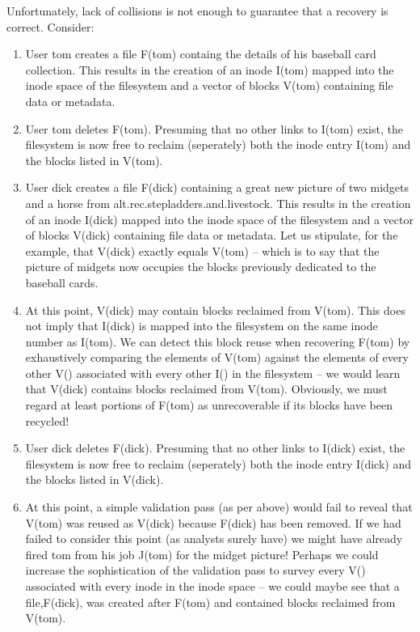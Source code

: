 \documentclass[letterpaper]{article}
\begin{document}
Unfortunately, lack of collisions is not enough to guarantee that a
recovery is correct. Consider:

\begin{enumerate}
\item User {\ttfamily tom} creates a file F(tom) containg the
details of his baseball card collection. This results in the
creation of an inode I(tom) mapped into the inode
space of the filesystem and a vector of blocks V(tom)
containing file data or metadata.
\item User {\ttfamily tom} deletes F(tom). Presuming that 
no other links to I(tom) exist, the filesystem is now
free to reclaim (seperately) both the inode entry I(tom)
and the blocks listed in V(tom).
\item User {\ttfamily dick} creates a file F(dick) containing
a great new picture of two midgets and a horse from
alt.rec.stepladders.and.livestock. This results in the creation
of an inode I(dick) mapped into the inode space of the
filesystem and a vector of blocks V(dick) containing file
data or metadata. Let us stipulate, for the example,
that V(dick) exactly equals V(tom) -- which is to say
that the picture of midgets now occupies the blocks
previously dedicated to the baseball cards.
\item At this point, V(dick) may contain blocks reclaimed from
V(tom). This does not imply that I(dick) is mapped into the
filesystem on the same inode number as I(tom). We can detect
this block reuse when recovering F(tom) by exhaustively
comparing the elements of V(tom) against the elements of
every other V() associated with every other I()
in the filesystem -- we would learn that V(dick) contains blocks
reclaimed from V(tom). Obviously, we must regard at least portions
of F(tom) as unrecoverable if its blocks have been recycled!
\item User {\ttfamily dick} deletes F(dick). Presuming that 
no other links to I(dick) exist, the filesystem is now
free to reclaim (seperately) both the inode entry I(dick)
and the blocks listed in V(dick).
\item At this point, a simple validation pass
(as per above) would fail to reveal that V(tom) was
reused as V(dick) because F(dick) has been removed.
If we had failed to consider this point (as analysts
surely have) we might have already fired {\ttfamily tom} from his job J(tom) for the midget picture! Perhaps we
could increase the sophistication of the validation
pass to survey every V() associated with every inode 
in the inode space -- we could maybe see that
a file,F(dick), was created after F(tom) and contained blocks
reclaimed from V(tom).
        

\end{enumerate}
\end{document}
